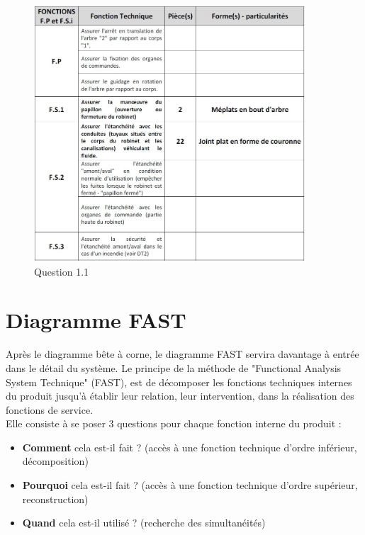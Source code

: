 \documentclass[
	11pt, %
	fleqn, %
	a4paper, %
]{LegrandOrangeBook}
\begin{document}
\begin{tcolorbox}[colback=gray!5!white,colframe=gray!75!gray,title=Document réponse]
\begin{figure}[H] %
	\centering %
	\includegraphics[width=0.9\textwidth]{Images/rob1.JPG} %
	\caption{Question 1.1}
	\label{rob1} %
\end{figure}



\end{tcolorbox}


\section{Diagramme FAST}

Après le diagramme bête à corne, le diagramme FAST servira davantage à entrée dans le détail du système. Le principe de la méthode de "Functional Analysis System Technique" (FAST), est de décomposer les fonctions techniques internes du produit jusqu’à établir leur relation, leur intervention, dans la réalisation des fonctions de service.\\

Elle consiste à se poser 3 questions pour chaque fonction interne du produit :
\begin{itemize}
    \item \textbf{Comment} cela est-il fait ? (accès à une fonction technique d’ordre inférieur, décomposition)
    \item \textbf{Pourquoi} cela est-il fait ? (accès à une fonction technique d’ordre supérieur, reconstruction)
    \item \textbf{Quand} cela est-il utilisé ? (recherche des simultanéités)
    
\end{itemize}
\end{document}
